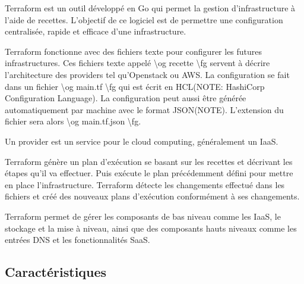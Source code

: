 \documentclass[]{article}
\begin{document}
Terraform est un outil développé en Go qui permet la gestion
d'infrastructure à l'aide de recettes. L'objectif de ce logiciel est de
permettre une configuration centralisée, rapide et efficace d'une
infrastructure.

Terraform fonctionne avec des fichiers texte pour configurer les futures
infrastructures. Ces fichiers texte appelé \textbackslash{}og recette
\textbackslash{}fg servent à décrire l'architecture des providers tel
qu'Openstack ou AWS. La configuration se fait dans un fichier
\textbackslash{}og main.tf \textbackslash{}fg qui est écrit en HCL(NOTE:
HashiCorp Configuration Language). La configuration peut aussi être
générée automatiquement par machine avec le format JSON(NOTE).
L'extension du fichier sera alors \textbackslash{}og main.tf.json
\textbackslash{}fg.

Un provider est un service pour le cloud computing, généralement un
IaaS.

Terraform génère un plan d'exécution se basant sur les recettes et
décrivant les étapes qu'il va effectuer. Puis exécute le plan
précédemment défini pour mettre en place l'infrastructure. Terraform
détecte les changements effectué dans les fichiers et créé des nouveaux
plans d'exécution conformément à ses changements.

Terraform permet de gérer les composants de bas niveau comme les IaaS,
le stockage et la mise à niveau, ainsi que des composants hauts niveaux
comme les entrées DNS et les fonctionnalités SaaS.

\subsection{Caractéristiques}\label{caractuxe9ristiques}
\end{document}
